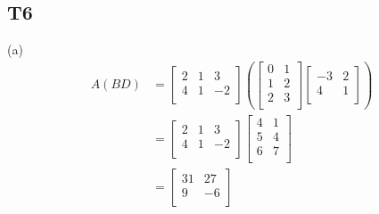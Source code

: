\documentclass{article}
\begin{document}
\subsection{T6}
(a) 
\begin{align*}
A(BD) &= 
\begin{bmatrix} 
    2 & 1 & 3\\ 
    4 & 1 & -2\\
\end{bmatrix} 
\left(
\begin{bmatrix} 
    0 & 1\\
    1 & 2\\ 
    2 & 3\\
\end{bmatrix}
\begin{bmatrix}
    -3 & 2\\
    4 & 1\\
\end{bmatrix}
\right)\\
&= \begin{bmatrix} 
    2 & 1 & 3\\ 
    4 & 1 & -2\\
\end{bmatrix} 
\begin{bmatrix}
    4 & 1\\
    5 & 4\\
    6 & 7\\
\end{bmatrix}\\
&=
\begin{bmatrix}
    31 & 27\\
    9 & -6\\
\end{bmatrix}
\end{align*}
\end{document}
